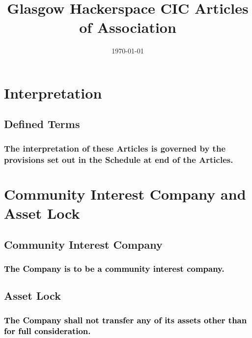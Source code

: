\documentclass[12pt]{article}
\title{Glasgow Hackerspace CIC Articles of Association}
\date{\today}
\def\fakecolour{black}
\begin{document}
\renewcommand\contentsname{
    \centering\bfseries\Large{Index to the Articles}\newline\justifying
}

\maketitle
\newpage
\tableofcontents
\newpage

\vspace{1.5\baselineskip}\section*{Interpretation}

\subsection{Defined Terms}
\subsubsection[General interpretation of Articles]{The interpretation of these Articles is governed by the provisions set out in the Schedule at end of the Articles.}

\vspace{1.5\baselineskip}\section*{Community Interest Company and Asset Lock}

\subsection{Community Interest Company}
\subsubsection[Community Interest Company]{\textcolor{\fakecolour}{The Company is to be a community interest company.}}
\subsection{Asset Lock}
  \subsubsection[Full Consideration of Assets]{\textcolor{\fakecolour}{The Company shall not transfer any of its assets other than for full consideration.}}\label{subsubsubsection:fullconsideration}
\end{document}
